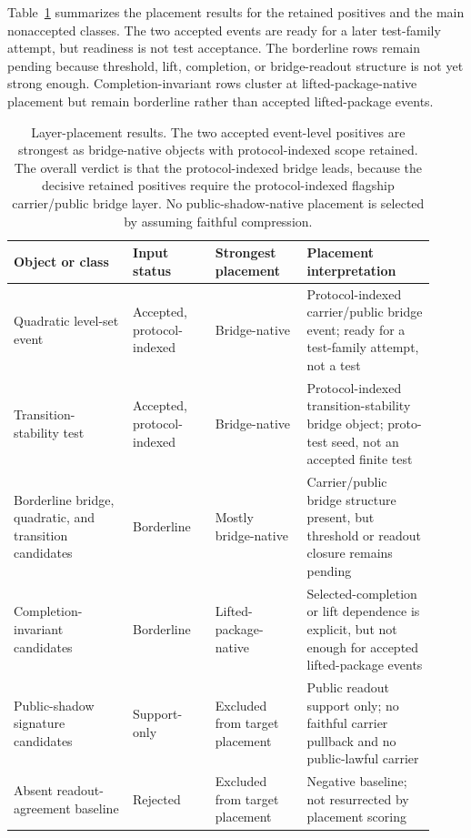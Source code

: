 \documentclass[11pt]{article}
\theoremstyle{definition}
\begin{document}
Table~\ref{tab:layer-placement-results} summarizes the placement results for the retained positives and the main nonaccepted classes. The two accepted events are ready for a later test-family attempt, but readiness is not test acceptance. The borderline rows remain pending because threshold, lift, completion, or bridge-readout structure is not yet strong enough. Completion-invariant rows cluster at lifted-package-native placement but remain borderline rather than accepted lifted-package events.

\begin{table}[t]
\centering
\small
\setlength{\tabcolsep}{4pt}
\begin{tabular}{p{0.26\linewidth}p{0.18\linewidth}p{0.20\linewidth}p{0.28\linewidth}}
\hline
\textbf{Object or class} & \textbf{Input status} & \textbf{Strongest placement} & \textbf{Placement interpretation} \\
\hline
Quadratic level-set event
&
Accepted, protocol-indexed
&
Bridge-native
&
Protocol-indexed carrier/public bridge event; ready for a test-family attempt, not a test
\\[0.4em]
Transition-stability test
&
Accepted, protocol-indexed
&
Bridge-native
&
Protocol-indexed transition-stability bridge object; proto-test seed, not an accepted finite test
\\[0.4em]
Borderline bridge, quadratic, and transition candidates
&
Borderline
&
Mostly bridge-native
&
Carrier/public bridge structure present, but threshold or readout closure remains pending
\\[0.4em]
Completion-invariant candidates
&
Borderline
&
Lifted-package-native
&
Selected-completion or lift dependence is explicit, but not enough for accepted lifted-package events
\\[0.4em]
Public-shadow signature candidates
&
Support-only
&
Excluded from target placement
&
Public readout support only; no faithful carrier pullback and no public-lawful carrier
\\[0.4em]
Absent readout-agreement baseline
&
Rejected
&
Excluded from target placement
&
Negative baseline; not resurrected by placement scoring
\\
\hline
\end{tabular}
\caption{Layer-placement results. The two accepted event-level positives are strongest as bridge-native objects with protocol-indexed scope retained. The overall verdict is that the protocol-indexed bridge leads, because the decisive retained positives require the protocol-indexed flagship carrier/public bridge layer. No public-shadow-native placement is selected by assuming faithful compression.}
\label{tab:layer-placement-results}
\end{table}
\end{document}
